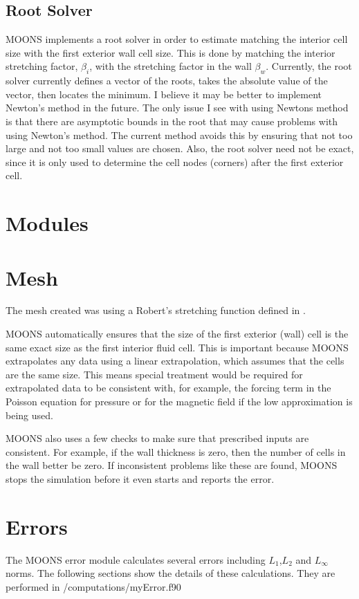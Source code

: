 \subsection{Root Solver}
MOONS implements a root solver in order to estimate matching the interior cell size with the first exterior wall cell size. This is done by matching the interior stretching factor, $\beta_i$, with the stretching factor in the wall $\beta_w$. Currently, the root solver currently defines a vector of the roots, takes the absolute value of the vector, then locates the minimum. I believe it may be better to implement Newton's method in the future. The only issue I see with using Newtons method is that there are asymptotic bounds in the root that may cause problems with using Newton's method. The current method avoids this by ensuring that not too large and not too small values are chosen. Also, the root solver need not be exact, since it is only used to determine the cell nodes (corners) after the first exterior cell.

\section{Modules}

\section{Mesh}
The mesh created was using a Robert's stretching function defined in \cite{pletcher2012computational}. 

MOONS automatically ensures that the size of the first exterior (wall) cell is the same exact size as the first interior fluid cell. This is important because MOONS extrapolates any data using a linear extrapolation, which assumes that the cells are the same size. This means special treatment would be required for extrapolated data to be consistent with, for example, the forcing term in the Poisson equation for pressure or for the magnetic field if the low \Rem approximation is being used.

MOONS also uses a few checks to make sure that prescribed inputs are consistent. For example, if the wall thickness is zero, then the number of cells in the wall better be zero. If inconsistent problems like these are found, MOONS stops the simulation before it even starts and reports the error.

\section{Errors}
The MOONS error module calculates several errors including $L_1$,$L_2$ and $L_{\infty}$ norms. The following sections show the details of these calculations. They are performed in /computations/myError.f90

